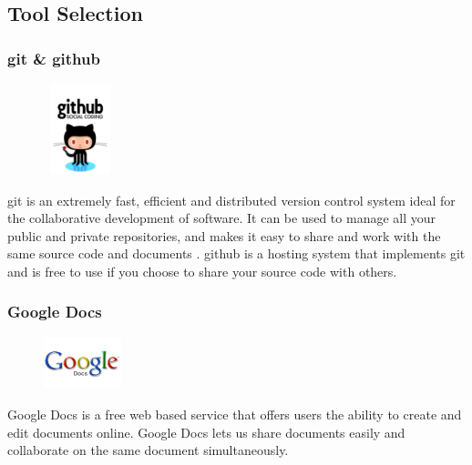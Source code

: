 \subsection{Tool Selection}

\subsubsection{\gls{git} \& \gls{github}}
\begin{figure}
  \vspace{-50pt}
  \begin{center}
    \includegraphics[width=80px,height=100px]{GitHub}
  \end{center}

\end{figure}
\gls{git} is an extremely fast, efficient and distributed version control system ideal for the collaborative development of software. It can be used to manage all your public and private repositories, and makes it easy to share and work with the same source code and documents \cite{bib:git}. \gls{github} is a hosting system that implements git and is free to use if you choose to share your source code with others. 

\subsubsection{Google Docs}
\begin{figure}
  \vspace{-105pt}
  \begin{center}
    \includegraphics[width=0.2\textwidth]{GoogleDocs}
  \end{center}

\end{figure}
Google Docs is a free web based service that offers users the ability to create and edit documents online. Google Docs lets us share documents easily and collaborate on the same document simultaneously.    

